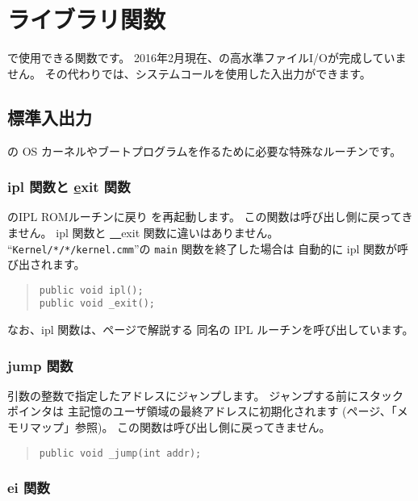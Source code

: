% 
%
\chapter{ライブラリ関数}

\cmml で使用できる関数です。
2016年2月現在、\tacos の高水準ファイルI/Oが完成していません。
その代わり\tacos では、システムコールを使用した入出力ができます。

\section{標準入出力}

\tac の OS カーネルやブートプログラムを作るために必要な特殊なルーチンです。

\subsection{ipl 関数と \ul exit 関数}
\tac のIPL ROMルーチンに戻り \tac を再起動します。
この関数は呼び出し側に戻ってきません。
ipl 関数と \underline{~~}exit 関数に違いはありません。
``{\tt Kernel/*/*/kernel.cmm}''の \verb/main/ 関数を終了した場合は
自動的に ipl 関数が呼び出されます。

\begin{quote}
\begin{verbatim}
public void ipl();
public void _exit();
\end{verbatim}
\end{quote}

なお、ipl 関数は、\pageref{app:ipl}ページで解説する
同名の IPL ルーチンを呼び出しています。

\subsection{\ul jump 関数}

引数の整数で指定したアドレスにジャンプします。
ジャンプする前にスタックポインタは
\tac 主記憶のユーザ領域の最終アドレスに初期化されます
(\pageref{app:memmap}ページ、「メモリマップ」参照)。
この関数は呼び出し側に戻ってきません。

\begin{quote}
\begin{verbatim}
public void _jump(int addr);
\end{verbatim}
\end{quote}

\subsection{ei 関数}

